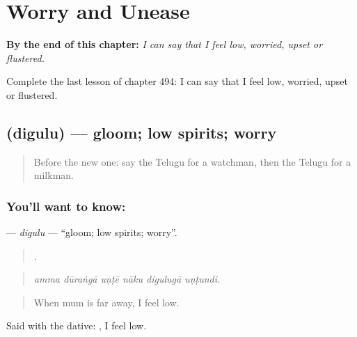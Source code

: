 
\chapter{Worry and Unease}
\label{ch:te-worry-and-unease}

\begin{chapteropening}
\textbf{By the end of this chapter:} \emph{I can say that I feel low, worried, upset or flustered.}

Complete the last lesson of chapter 494: I can say that I feel low, worried, upset or flustered.
\end{chapteropening}

\section[\texorpdfstring{\te{దిగులు} (digulu)}{దిగులు (digulu)}]{ (digulu) — gloom; low spirits; worry}

\label{lesson:TE-C494-digulu}



\begin{quote}
Before the new one: say the Telugu for a watchman, then the Telugu for a milkman.
\end{quote}

\subsection*{You'll want to know: }
\textbf{} — \emph{digulu} — \textquotedblleft{}gloom; low spirits; worry\textquotedblright{}.

\begin{quote}
     .
\end{quote}

\begin{quote}
\emph{amma dūraṅgā uṇṭē nāku digulugā uṇṭundi.}
\end{quote}

\begin{quote}
When mum is far away, I feel low.
\end{quote}

Said with the dative:   , I feel low.


